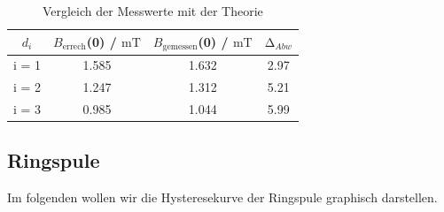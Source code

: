   \begin{table}
    \centering
    \caption{Vergleich der Messwerte mit der Theorie}
    \begin{tabular}{c c c c }
      \toprule
      $d_{i}$ & $B_{\text{errech}}$(0) / $\unit{\milli\tesla}$ &  $B_{\text{gemessen}}$(0) / $\unit{\milli\tesla}$ & $\increment_{Abw}$\\
      \midrule
      i = 1  & 1.585 &         1.632  &     2.97 \\ 
      i = 2  & 1.247 &         1.312  &     5.21 \\ 
      i = 3  & 0.985 &         1.044  &     5.99 \\ 
      \bottomrule
    \end{tabular}
  \end{table}

\subsection{Ringspule}

Im folgenden wollen wir die Hysteresekurve der Ringspule graphisch darstellen.

